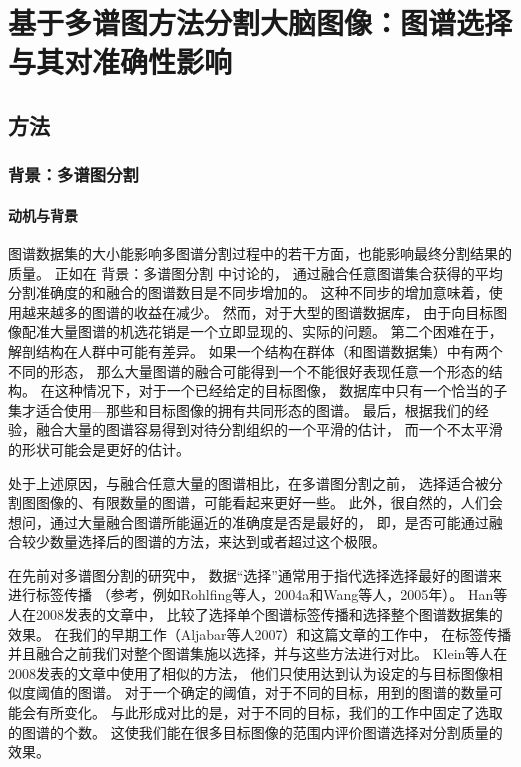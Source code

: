 
\chapter*{基于多谱图方法分割大脑图像：图谱选择与其对准确性影响}
\section*{方法}
\subsection*{背景：多谱图分割}
\subsubsection*{动机与背景}
图谱数据集的大小能影响多图谱分割过程中的若干方面，也能影响最终分割结果的质量。
正如在 背景：多谱图分割 中讨论的，
通过融合任意图谱集合获得的平均分割准确度的和融合的图谱数目是不同步增加的。
这种不同步的增加意味着，使用越来越多的图谱的收益在减少。
然而，对于大型的图谱数据库，
由于向目标图像配准大量图谱的机选花销是一个立即显现的、实际的问题。
第二个困难在于，解剖结构在人群中可能有差异。
如果一个结构在群体（和图谱数据集）中有两个不同的形态，
那么大量图谱的融合可能得到一个不能很好表现任意一个形态的结构。
在这种情况下，对于一个已经给定的目标图像，
数据库中只有一个恰当的子集才适合使用---那些和目标图像的拥有共同形态的图谱。
最后，根据我们的经验，融合大量的图谱容易得到对待分割组织的一个平滑的估计，
而一个不太平滑的形状可能会是更好的估计。

处于上述原因，与融合任意大量的图谱相比，在多谱图分割之前，
选择适合被分割图图像的、有限数量的图谱，可能看起来更好一些。
此外，很自然的，人们会想问，通过大量融合图谱所能逼近的准确度是否是最好的，
即，是否可能通过融合较少数量选择后的图谱的方法，来达到或者超过这个极限。

在先前对多谱图分割的研究中，
数据``选择''通常用于指代选择选择最好的图谱来进行标签传播
（参考，例如Rohlfing等人，2004a和Wang等人，2005年）。
Han等人在2008发表的文章中，
比较了选择单个图谱标签传播和选择整个图谱数据集的效果。
在我们的早期工作（Aljabar等人2007）和这篇文章的工作中，
在标签传播并且融合之前我们对整个图谱集施以选择，并与这些方法进行对比。
Klein等人在2008发表的文章中使用了相似的方法，
他们只使用达到认为设定的与目标图像相似度阈值的图谱。
对于一个确定的阈值，对于不同的目标，用到的图谱的数量可能会有所变化。
与此形成对比的是，对于不同的目标，我们的工作中固定了选取的图谱的个数。
这使我们能在很多目标图像的范围内评价图谱选择对分割质量的效果。


